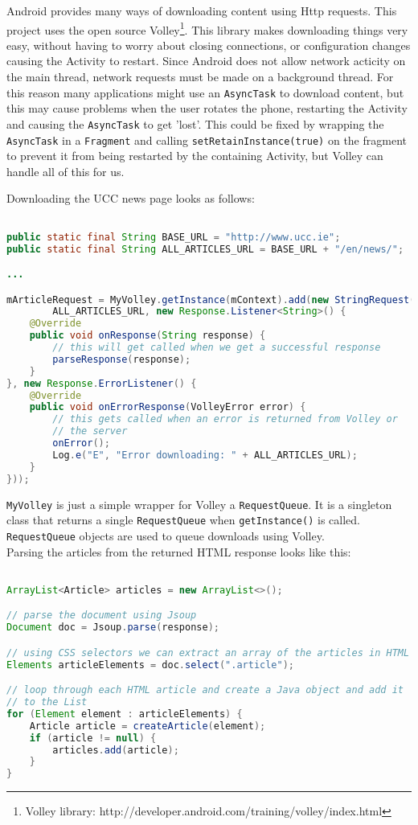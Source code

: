 Android provides many ways of downloading content using Http requests. This
project uses the open source
Volley\footnote{Volley library: http://developer.android.com/training/volley/index.html}.
This library makes downloading things very easy, without having to worry about
closing connections, or configuration changes causing the Activity to restart.
Since Android does not allow network acticity on the main thread, network
requests must be made on a background thread. For this reason many applications
might use an \texttt{AsyncTask} to download content, but this may cause problems
when the user rotates the phone, restarting the Activity and causing the 
\texttt{AsyncTask} to get 'lost'. This could be fixed by wrapping the
\texttt{AsyncTask} in a \texttt{Fragment} and calling
\texttt{setRetainInstance(true)} on the fragment to prevent it from being
restarted by the containing Activity, but Volley can handle all of this for us.

Downloading the UCC news page looks as follows:
\begin{lstlisting}[language=Java]

public static final String BASE_URL = "http://www.ucc.ie";
public static final String ALL_ARTICLES_URL = BASE_URL + "/en/news/";

...

mArticleRequest = MyVolley.getInstance(mContext).add(new StringRequest(
        ALL_ARTICLES_URL, new Response.Listener<String>() {
    @Override
    public void onResponse(String response) {
        // this will get called when we get a successful response
        parseResponse(response);
    }
}, new Response.ErrorListener() {
    @Override
    public void onErrorResponse(VolleyError error) {
        // this gets called when an error is returned from Volley or
        // the server
        onError();
        Log.e("E", "Error downloading: " + ALL_ARTICLES_URL);
    }
}));

\end{lstlisting}

\texttt{MyVolley} is just a simple wrapper for Volley a \texttt{RequestQueue}.
It is a singleton class that returns a single \texttt{RequestQueue} when 
\texttt{getInstance()} is called. \texttt{RequestQueue} objects are used to
queue downloads using Volley.\\
Parsing the articles from the returned HTML response looks like this:

\begin{lstlisting}[language=Java]

ArrayList<Article> articles = new ArrayList<>();

// parse the document using Jsoup
Document doc = Jsoup.parse(response);

// using CSS selectors we can extract an array of the articles in HTML
Elements articleElements = doc.select(".article");

// loop through each HTML article and create a Java object and add it
// to the List
for (Element element : articleElements) {
    Article article = createArticle(element);
    if (article != null) {
        articles.add(article);
    }
}

\end{lstlisting}

